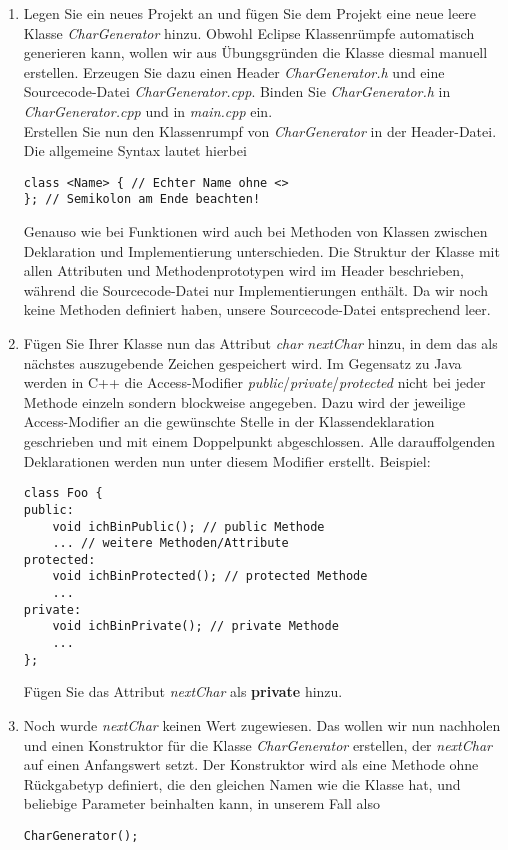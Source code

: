 \documentclass[
  accentcolor=tud1c,	%
  colorbacktitle,		%
  inverttitle,			%
  german,				%
  twoside
]{tudexercise}
\begin{document}
\begin{enumerate}

\item Legen Sie ein neues Projekt an und fügen Sie dem Projekt eine neue leere Klasse \emph{CharGenerator} hinzu. Obwohl Eclipse Klassenrümpfe automatisch generieren kann, wollen wir aus Übungsgründen die Klasse diesmal manuell erstellen. Erzeugen Sie dazu einen Header \emph{CharGenerator.h} und eine Sourcecode-Datei \emph{CharGenerator.cpp}. Binden Sie \emph{CharGenerator.h} in \emph{CharGenerator.cpp} und in \emph{main.cpp} ein.\\

Erstellen Sie nun den Klassenrumpf von \emph{CharGenerator} in der Header-Datei. Die allgemeine Syntax lautet hierbei 

\begin{lstlisting}
class <Name> { // Echter Name ohne <> 
}; // Semikolon am Ende beachten!
\end{lstlisting}

Genauso wie bei Funktionen wird auch bei Methoden von Klassen zwischen Deklaration und Implementierung unterschieden. Die Struktur der Klasse mit allen Attributen und Methodenprototypen wird im Header beschrieben, während die Sourcecode-Datei nur Implementierungen enthält. Da wir noch keine Methoden definiert haben, unsere Sourcecode-Datei  entsprechend leer.

\item
Fügen Sie Ihrer Klasse nun das Attribut \emph{char nextChar} hinzu, in dem das als nächstes auszugebende Zeichen gespeichert wird. Im Gegensatz zu Java  werden in C++ die Access-Modifier \emph{public}/\emph{private}/\emph{protected} nicht bei jeder Methode einzeln sondern blockweise angegeben. Dazu wird der jeweilige Access-Modifier an die gewünschte Stelle in der Klassendeklaration geschrieben und mit einem Doppelpunkt abgeschlossen.  Alle darauffolgenden Deklarationen werden nun unter diesem Modifier erstellt. Beispiel:

\begin{lstlisting}
class Foo { 
public:
	void ichBinPublic(); // public Methode
	... // weitere Methoden/Attribute
protected:
	void ichBinProtected(); // protected Methode
	...
private:
	void ichBinPrivate(); // private Methode
	...
};
\end{lstlisting}

Fügen Sie das Attribut \emph{nextChar} als \textbf{private} hinzu.

\item Noch wurde \emph{nextChar} keinen Wert zugewiesen. Das wollen wir nun nachholen und einen Konstruktor für die Klasse \emph{CharGenerator} erstellen, der \emph{nextChar} auf einen Anfangswert setzt. Der Konstruktor wird als eine Methode ohne Rückgabetyp definiert, die den gleichen Namen wie die Klasse hat, und beliebige Parameter beinhalten kann, in unserem Fall also 
\begin{lstlisting}
CharGenerator();
\end{lstlisting}


\end{enumerate}
\end{document}
